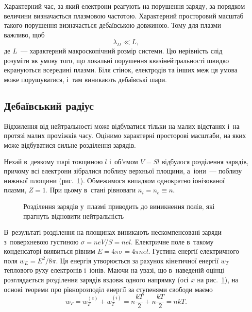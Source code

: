 Характерний час, за який електрони реагують на порушення заряду, за порядком величини визначається плазмовою частотою. Характерний просторовий масштаб такого порушення визначається дебаївською довжиною. Тому для плазми важливо, щоб
\begin{equation}
	\lambda_D\ll L,
\end{equation}
де $L$~--- характерний макроскопічний розмір системи. Цю нерівність слід розуміти як умову того, що локальні порушення квазінейтральності швидко екрануються всередині плазми. Біля стінок, електродів та інших меж ця умова може порушуватися, і~там виникають дебаївські шари.

\subsection{Дебаївський радіус}

Відхилення від нейтральності може відбуватися тільки на малих відстанях і~на протязі малих проміжків часу. Оцінимо характерні просторові масштаби, на яких може відбуватися сильне розділення зарядів.

Нехай в~деякому шарі товщиною $l$ і~об'ємом $V = Sl$ відбулося розділення зарядів, причому всі електрони зібралися поблизу верхньої площини, а~іони~--- поблизу нижньої площини (рис.~\ref{pic:charge-separation}). Обмежимося випадком однократно іонізованої плазми, $Z = 1$. При цьому в~стані рівноваги $n_i = n_e \equiv n$.

\begin{figure}[h!]\centering
	\caption{Розділення зарядів у~плазмі приводить до виникнення полів, які прагнуть відновити нейтральність}
	\label{pic:charge-separation}
\end{figure}

В~результаті розділення на площинах виникають нескомпенсовані заряди з~поверхневою густиною $\sigma = neV/S = nel$. Електричне поле в~такому конденсаторі виявиться рівним $E = 4\pi\sigma = 4\pi nel$. Густина енергії електричного поля $w_E = E^2/8\pi$. Ця енергія утворюється за рахунок кінетичної енергії $w_T$ теплового руху електронів і~іонів. Маючи на увазі, що в~наведеній оцінці розглядається розділення зарядів вздовж одного напрямку (осі $x$ на рис.~\ref{pic:charge-separation}), на основі теореми про рівнорозподіл енергії за ступенями свободи маємо
\begin{equation*}
	w_T = w_T^{(e)} + w_T^{(i)} = n\frac{kT}{2} + n\frac{kT}{2} = nkT.
\end{equation*}

